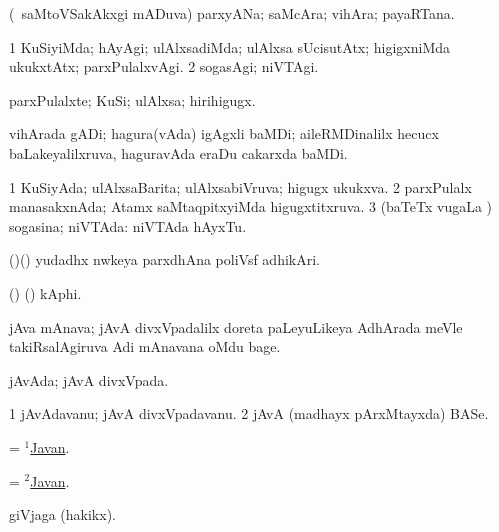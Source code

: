 \bentry
{}
\gl{\nA}
\bmng
(\kanmu\ saMtoVSakAkxgi mADuva) parxyANa; saMcAra; vihAra; payaRTana. 
\emng
\eentry

\bentry
{}
\gl{\kirxvi}
\bmng
\bnum
\num{1} KuSiyiMda; hAyAgi; ulAlxsadiMda; ulAlxsa sUcisutAtx; higigxniMda ukukxtAtx; parxPulalxvAgi. 
\num{2} sogasAgi; niVTAgi. 
\enum
\emng
\eentry

\bentry
{}
\gl{\nA}
\bmng
parxPulalxte; KuSi; ulAlxsa; hirihigugx. 
\emng
\eentry

\bentry
{}
\gl{\nA}
\bmng
vihArada gADi; hagura(vAda) igAgxli baMDi; aileRMDinalilx hecucx baLakeyalilxruva, haguravAda eraDu cakarxda baMDi. 
\emng
\eentry

\bentry
{}
\gl{\gu}
\bmng
\bnum
\num{1} KuSiyAda; ulAlxsaBarita; ulAlxsabiVruva; higugx ukukxva. 
\num{2} parxPulalx manasakxnAda; Atamx saMtaqpitxyiMda higugxtitxruva. 
\num{3} (baTeTx \mo vugaLa \vi) sogasina; niVTAda:  niVTAda hAyxTu. 
\enum
\emng
\eentry

\bentry
{}
\gl{\nA}
\bmng
(\nw)(\AmA) yudadhx nwkeya parxdhAna poliVsf adhikAri. 
\emng
\eentry

\bentry
{}
\gl{\nA}
\bmng
(\ame) (\ashi) kAphi. 
\emng
\eentry

\bentry
{}
\gl{\nA}
\bmng
jAva mAnava; jAvA divxVpadalilx doreta paLeyuLikeya AdhArada meVle takiRsalAgiruva Adi mAnavana oMdu bage. 
\emng
\eentry

\bentry
{}
\gl{\gu}
\bmng
jAvAda; jAvA divxVpada. 
\emng
\eentry

\bentry
{}
\gl{\nA}
\bmng
\bnum
\num{1} jAvAdavanu; jAvA divxVpadavanu. 
\num{2} jAvA (madhayx pArxMtayxda) BASe. 
\enum
\emng
\eentry

\bentry
{}
\gl{\gu}
\bmng
 = \hyperlink{Javan(1)}{$^1$Javan}. 
\emng
\eentry


\bentry
{}
\gl{\nA}
\bmng
 =  \hyperlink{Javan(2)}{$^2$Javan}. 
\emng
\eentry

\bentry
{}
\gl{\nA}
\bmng
giVjaga (hakikx). 
\emng
\eentry

